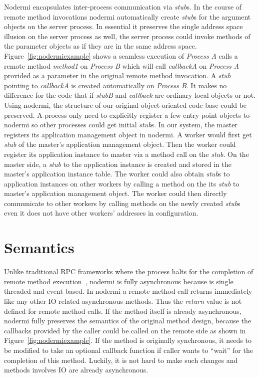 \nodermiexamplefig{}

Nodermi encapsulates inter-process communication via \emph{stub}s.
In the course of remote method invocations
nodermi automatically 
create \emph{stub}s for the argument objects on the server process.
In essential it preserves the single address space illusion on the
server process as well,
the server process could invoke methods of the parameter objects
as if they are in the same address space.
Figure~\ref{fig:nodermiexample} shows a
seamless execution of \emph{Process A}
calls a remote method \emph{method1} on \emph{Process B} which
will call \emph{callbackA} on  \emph{Process A} provided
as a parameter in the original remote method invocation.
A \emph{stub} pointing to \emph{callbackA} is created automatically
on \emph{Process B}.
It makes no difference for the code that if \emph{stubB} and \emph{callback}
are ordinary local objects or not.
Using nodermi, 
the structure of our original object-oriented code base could be preserved.
A process only need to explicitly register a few entry point objects to nodermi 
so other processes could get initial \emph{stub}s.
In our system, the master registers its application management object in nodermi.
A worker would first get \emph{stub} of the master's application management object.
Then the worker could register its application instance to master 
via a method call on the \emph{stub}.
On the master side, a \emph{stub} to the application instance is created and
stored in the master's application instance table.
The worker could also obtain \emph{stub}s to application instances on other workers by 
calling a method on the its \emph{stub} to master's application management object.
The worker could then directly communicate to other workers
by calling methods on the newly created \emph{stub}s 
even it does not have other workers' addresses in configuration.


\section{Semantics}

Unlike traditional RPC frameworks where the process halts for the
completion of remote method execution~\cite{birrell1984implementing},
nodermi is fully asynchronous because \nodejs
is single threaded and event based.
In nodermi a remote method call returns immediately
like any other IO related asynchronous methods.
Thus the \emph{return} value is not defined for remote method calls.
If the method itself is already asynchronous, 
nodermi fully preserves the semantics of the original method design,
because the callbacks provided by the caller could
be called on the remote side as shown in Figure~\ref{fig:nodermiexample}.
If the method is originally synchronous,
it needs to be modified to take an optional callback function
if caller wants to ``wait'' for the completion of this method.
Luckily, it is not hard to make such changes and methods involves
IO are already asynchronous.


